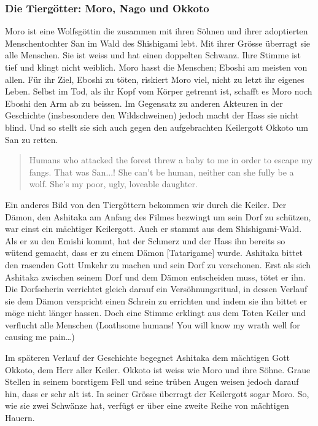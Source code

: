 \subsubsection*{Die Tiergötter: Moro, Nago und Okkoto}
Moro ist eine Wolfsgöttin die zusammen mit ihren Söhnen und ihrer adoptierten Menschentochter San im Wald des Shishigami lebt. Mit ihrer Grösse überragt sie alle Menschen. Sie ist weiss und hat einen doppelten Schwanz. Ihre Stimme ist tief und klingt nicht weiblich. Moro hasst die Menschen; Eboshi am meisten von allen. Für ihr Ziel, Eboshi zu töten, riskiert Moro viel, nicht zu letzt ihr eigenes Leben. Selbst im Tod, als ihr Kopf vom Körper getrennt ist, schafft es Moro noch Eboshi den Arm ab zu beissen. Im Gegensatz zu anderen Akteuren in der Geschichte (insbesondere den Wildschweinen) jedoch macht der Hass sie nicht blind. Und so stellt sie sich auch gegen den aufgebrachten Keilergott Okkoto um San zu retten.

\begin{quote}
\glqq Humans who attacked the forest threw a baby to me in order to escape my fangs. That was San...! She can't be human, neither can she fully be a wolf. She's my poor, ugly, loveable daughter.\grqq {}
\end{quote}

Ein anderes Bild von den Tiergöttern bekommen wir durch die Keiler. Der Dämon, den Ashitaka am Anfang des Filmes bezwingt um sein Dorf zu schützen, war einst ein mächtiger Keilergott. Auch er stammt aus dem Shishigami-Wald. Als er zu den Emishi kommt, hat der Schmerz und der Hass ihn bereits so wütend gemacht, dass er zu einem Dämon [Tatarigame] wurde. Ashitaka bittet den rasenden Gott Umkehr zu machen und sein Dorf zu verschonen. Erst als sich Ashitaka zwischen seinem Dorf und dem Dämon entscheiden muss, tötet er ihn. Die Dorfseherin verrichtet gleich darauf ein Versöhnungsritual, in dessen Verlauf sie dem Dämon verspricht einen Schrein zu errichten und indem sie ihn bittet er möge nicht länger hassen. Doch eine Stimme erklingt aus dem Toten Keiler und verflucht alle Menschen (\glqq  Loathsome humans! You will know my wrath well for causing me pain\dots \grqq {}) 

Im späteren Verlauf der Geschichte begegnet Ashitaka dem mächtigen Gott Okkoto, dem Herr aller Keiler. Okkoto ist weiss wie Moro und ihre Söhne. Graue Stellen in seinem borstigem Fell und seine trüben Augen weisen jedoch darauf hin, dass er sehr alt ist. In seiner Grösse überragt der Keilergott sogar Moro. So, wie sie zwei Schwänze hat, verfügt er über eine zweite Reihe von mächtigen Hauern.  

